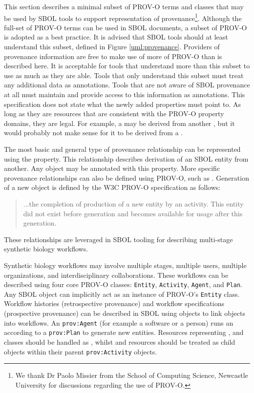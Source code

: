 This section describes a minimal subset of PROV-O terms and classes that may be used by SBOL tools to support representation of provenance\footnote{We thank Dr Paolo Missier from the School of Computing Science, Newcastle University for discussions regarding the use of PROV-O.}. Although the full-set of PROV-O terms can be used in SBOL documents, a subset of PROV-O is adopted as a best practice. It is advised that SBOL tools should at least understand this subset, defined in Figure \ref{uml:provenance}. Providers of provenance information are free to make use of more of PROV-O than is described here. It is acceptable for tools that understand more than this subset to use as much as they are able. Tools that only understand this subset must treat any additional data as annotations. Tools that are not aware of SBOL provenance at all must maintain and provide access to this information as annotations. This specification does not state what the newly added properties must point to. As long as they are resources that are consistent with the PROV-O property domains, they are legal. For example, a  may be derived from another , but it would probably not make sense for it to be derived from a .

The most basic and general type of provenance relationship can be represented using the  property. This relationship describes derivation of an SBOL entity from another. 
Any  object may be annotated with this property. More specific provenance relationships can also be defined using PROV-O, such as . Generation of a new object is defined by the W3C PROV-O specification as follows:
\begin{quote}
	...the completion of production of a new entity by an activity. This entity did not exist before generation and becomes available for usage after this generation.
\end{quote}
These relationships are leveraged in SBOL tooling for describing multi-stage synthetic biology workflows.

Synthetic biology workflows may involve multiple stages, multiple users, multiple organizations, and interdisciplinary collaborations. These workflows can be described using four core PROV-O classes: \texttt{Entity}, \texttt{Activity}, \texttt{Agent}, and \texttt{Plan}. Any SBOL  object can implicitly act as an instance of PROV-O's \texttt{Entity} class. Workflow histories (retrospective provenance) and workflow specifications (prospective provenance) can be described in SBOL using  objects to link  objects into workflows. An \texttt{prov:Agent} (for example a software or a person) runs an  according to a \texttt{prov:Plan} to generate new entities. Resources representing ,  and  classes should be handled as , whilst  and  resources should be treated as child  objects within their parent \texttt{prov:Activity} objects.  

